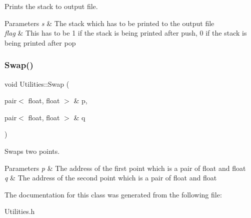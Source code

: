 Prints the stack to output file. 


\begin{DoxyParams}{Parameters}
{\em s} & The stack which has to be printed to the output file \\
\hline
{\em flag} & This has to be 1 if the stack is being printed after push, 0 if the stack is being printed after pop \\
\hline
\end{DoxyParams}
\mbox{\label{classUtilities_af484ed1328548e360a206e0c2fd8f6a2}} 
\subsubsection{\texorpdfstring{Swap()}{Swap()}}
{\footnotesize\ttfamily void Utilities\+::\+Swap (\begin{DoxyParamCaption}\item[{pair$<$ float, float $>$ \&}]{p,  }\item[{pair$<$ float, float $>$ \&}]{q }\end{DoxyParamCaption})}



Swaps two points. 


\begin{DoxyParams}{Parameters}
{\em p} & The address of the first point which is a pair of float and float \\
\hline
{\em q} & The address of the second point which is a pair of float and float \\
\hline
\end{DoxyParams}


The documentation for this class was generated from the following file\+:\begin{DoxyCompactItemize}
\item 
Utilities.\+h\end{DoxyCompactItemize}
